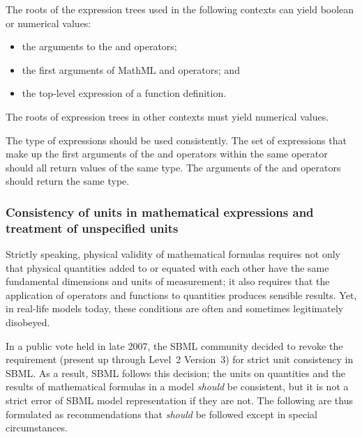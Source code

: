 The roots of the expression trees used in the following contexts can
yield boolean or numerical values:

\begin{itemize}\setlength{\parskip}{-0.2ex}

\item the arguments to the  and  operators;

\item the first arguments of MathML  and 
operators; and

\item the top-level expression of a function definition.

\end{itemize}

The roots of expression trees in other contexts must yield
numerical values.

The type of expressions should be used consistently.  The set of
expressions that make up the first arguments of the 
and  operators within the same 
operator should all return values of the same type. The arguments
of the  and  operators should return the same
type.


\subsubsection{Consistency of units in mathematical expressions
  and treatment of unspecified units}
\label{sec:operator-arg-types}
\label{sec:unit-consistency}

Strictly speaking, physical validity of mathematical formulas
requires not only that physical quantities added to or equated
with each other have the same fundamental dimensions and units of
measurement; it also requires that the application of operators
and functions to quantities produces sensible results.  Yet, in
real-life models today, these conditions are often and sometimes
legitimately disobeyed.

In a public vote held in late 2007, the SBML community decided to
revoke the requirement (present up through Level~2 Version~3) for
strict unit consistency in SBML.  As a result, SBML \thisL follows
this decision; the units on quantities and the results of
mathematical formulas in a model \emph{should} be consistent, but
it is not a strict error of SBML model representation if they are
not.  The following are thus formulated as recommendations that
\emph{should} be followed except in special circumstances.


